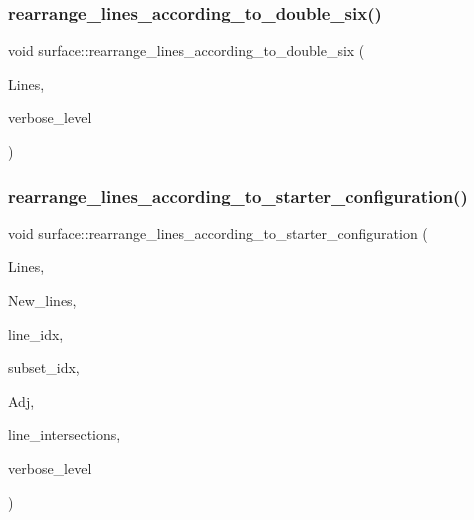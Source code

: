 \subsubsection{\texorpdfstring{rearrange\+\_\+lines\+\_\+according\+\_\+to\+\_\+double\+\_\+six()}{rearrange\_lines\_according\_to\_double\_six()}}
{\footnotesize\ttfamily void surface\+::rearrange\+\_\+lines\+\_\+according\+\_\+to\+\_\+double\+\_\+six (\begin{DoxyParamCaption}\item[{\mbox{\hyperlink{galois_8h_a09fddde158a3a20bd2dcadb609de11dc}{I\+NT}} $\ast$}]{Lines,  }\item[{\mbox{\hyperlink{galois_8h_a09fddde158a3a20bd2dcadb609de11dc}{I\+NT}}}]{verbose\+\_\+level }\end{DoxyParamCaption})}

\mbox{\label{classsurface_a3525fa80708d41bb6cbd5d5c14639c53}} 
\subsubsection{\texorpdfstring{rearrange\+\_\+lines\+\_\+according\+\_\+to\+\_\+starter\+\_\+configuration()}{rearrange\_lines\_according\_to\_starter\_configuration()}}
{\footnotesize\ttfamily void surface\+::rearrange\+\_\+lines\+\_\+according\+\_\+to\+\_\+starter\+\_\+configuration (\begin{DoxyParamCaption}\item[{\mbox{\hyperlink{galois_8h_a09fddde158a3a20bd2dcadb609de11dc}{I\+NT}} $\ast$}]{Lines,  }\item[{\mbox{\hyperlink{galois_8h_a09fddde158a3a20bd2dcadb609de11dc}{I\+NT}} $\ast$}]{New\+\_\+lines,  }\item[{\mbox{\hyperlink{galois_8h_a09fddde158a3a20bd2dcadb609de11dc}{I\+NT}}}]{line\+\_\+idx,  }\item[{\mbox{\hyperlink{galois_8h_a09fddde158a3a20bd2dcadb609de11dc}{I\+NT}}}]{subset\+\_\+idx,  }\item[{\mbox{\hyperlink{galois_8h_a09fddde158a3a20bd2dcadb609de11dc}{I\+NT}} $\ast$}]{Adj,  }\item[{\mbox{\hyperlink{classset__of__sets}{set\+\_\+of\+\_\+sets}} $\ast$}]{line\+\_\+intersections,  }\item[{\mbox{\hyperlink{galois_8h_a09fddde158a3a20bd2dcadb609de11dc}{I\+NT}}}]{verbose\+\_\+level }\end{DoxyParamCaption})}

